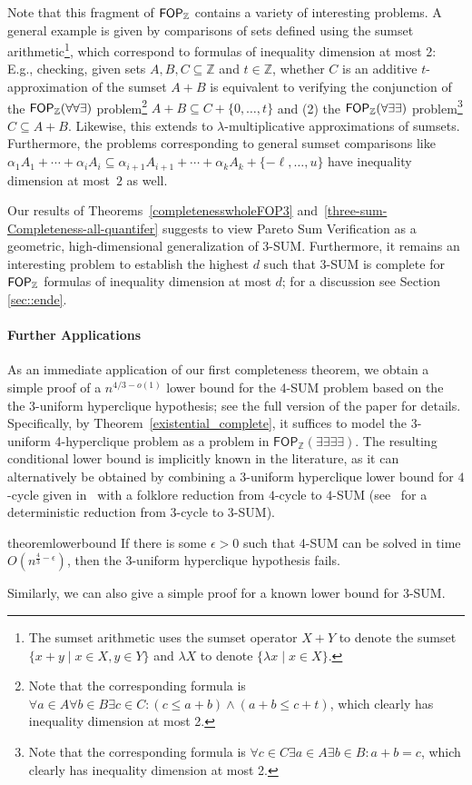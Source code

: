 Note that this fragment of $\mathsf{FOP}_{\mathbb{Z}}$ contains a variety of interesting problems. A general example is given by comparisons of sets defined using the sumset arithmetic\footnote{The sumset arithmetic uses the sumset operator $X+Y$ to denote the sumset $\{x+y\mid x\in X, y\in Y\}$ and $\lambda X$ to denote $\{\lambda x \mid x\in X\}$.}, which correspond to formulas of inequality dimension at most 2: E.g., checking, given sets $A,B,C\subseteq \mathbb{Z}$ and $t\in \mathbb{Z}$, whether $C$ is an additive $t$-approximation of the sumset $A+B$ is equivalent to verifying the conjunction of the $\mathsf{FOP}_{\mathbb{Z}}(\forall \forall \exists)$ problem\footnote{Note that the corresponding formula is $\forall a\in A\forall b\in B \exists c\in C: (c\le a+b) \wedge (a+b \le c+t)$, which clearly has inequality dimension at most 2.} $A+B \subseteq C+\{0,\dots,t\}$ and (2) the $\mathsf{FOP}_{\mathbb{Z}}(\forall \exists \exists)$ problem\footnote{Note that the corresponding formula is $\forall c\in C\exists a\in A\exists b\in B: a+b = c$, which clearly has inequality dimension at most 2.} $C\subseteq A+B$. Likewise, this extends to $\lambda$-multiplicative approximations of sumsets. Furthermore, the problems corresponding to general sumset comparisons like $\alpha_1 A_1 + \cdots + \alpha_i A_i \subseteq \alpha_{i+1} A_{i+1} + \cdots + \alpha_k A_{k} + \{-\ell, \dots, u\}$ have inequality dimension at most~$2$ as well.

Our results of Theorems~\ref{completenesswholeFOP3} and~\ref{three-sum-Completeness-all-quantifer} suggests to view Pareto Sum Verification as a geometric, high-dimensional generalization of $3$-SUM. Furthermore, it remains an interesting problem to establish the highest $d$ such that 3-SUM is complete for $\mathsf{FOP}_{\mathbb{Z}}$ formulas of inequality dimension at most $d$; for a discussion see Section \ref{sec::ende}.




\paragraph*{Further Applications}
As an immediate application of our first completeness theorem, we obtain a simple proof of a $n^{4/3-o(1)}$ lower bound for the 4-SUM problem based on the the $3$-uniform hyperclique hypothesis; see the full version of the paper for details. Specifically, by Theorem~\ref{existential_complete}, it suffices to model the 3-uniform 4-hyperclique problem as a problem in $\mathsf{FOP}_{\mathbb{Z}}(\exists \exists \exists \exists)$. The resulting conditional lower bound is implicitly known in the literature, as it can alternatively be obtained by combining a 3-uniform hyperclique lower bound for $4$-cycle given in~\cite{DBLP:conf/soda/LincolnWW18} with a folklore reduction from $4$-cycle to $4$-SUM (see~\cite{DBLP:journals/algorithmica/JafargholiV16} for a deterministic reduction from $3$-cycle to $3$-SUM).
\begin{restatable}{theorem}{lowerbound} \label{thm:4SUMlb}
    If there is some $\epsilon > 0$ such that 4-SUM can be solved in time $O(n^{\frac{4}{3}-\epsilon})$, then the 3-uniform hyperclique hypothesis fails. 
\end{restatable}
 Similarly, we can also give a simple proof for a known lower bound for $3$-SUM.

